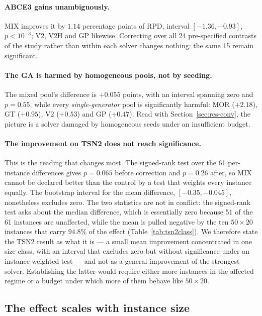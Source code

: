 \documentclass[review]{elsarticle}
\begin{document}
\paragraph{ABCE3 gains unambiguously.} MIX improves it by $1.14$ percentage
points of RPD, interval $[-1.36,-0.93]$, $p<10^{-3}$; V2, V2H and GP
likewise. Correcting over all 24 pre-specified contrasts of the study rather
than within each solver changes nothing: the same 15 remain significant.

\paragraph{The GA is harmed by homogeneous pools, not by seeding.} The
mixed pool's difference is $+0.055$ points, with an interval spanning zero
and $p=0.55$, while every \emph{single-generator} pool is significantly
harmful: MOR ($+2.18$), GT ($+0.95$), V2 ($+0.53$) and GP ($+0.47$). Read
with Section~\ref{sec:res-conv}, the picture is a solver damaged by
homogeneous seeds under an insufficient budget.

\paragraph{The improvement on TSN2 does not reach significance.} This is
the reading that changes most. The signed-rank test over the 61
per-instance differences gives $p=0.065$ before correction and $p=0.26$
after, so MIX cannot be declared better than the control by a test that
weights every instance equally. The bootstrap interval for the mean
difference, $[-0.35,-0.045]$, nonetheless excludes zero. The two statistics
are not in conflict: the signed-rank test asks about the median difference,
which is essentially zero because 51 of the 61 instances are unaffected,
while the mean is pulled negative by the ten $50\times20$ instances that
carry $94.8\%$ of the effect (Table~\ref{tab:tsn2class}). We therefore
state the TSN2 result as what it is --- a small mean improvement
concentrated in one size class, with an interval that excludes zero but
without significance under an instance-weighted test --- and not as a
general improvement of the strongest solver. Establishing the latter would
require either more instances in the affected regime or a budget under
which more of them behave like $50\times20$.

\subsection{The effect scales with instance size}\label{sec:res-size}
\end{document}

